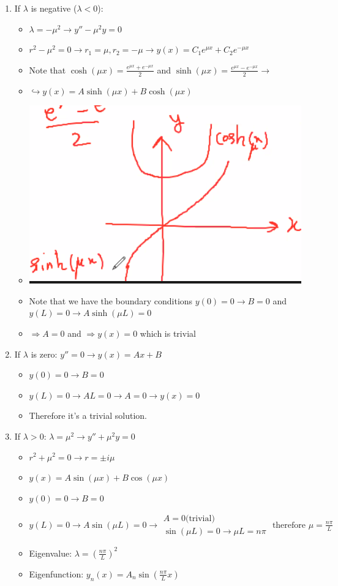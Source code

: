 \documentclass{article}
\begin{document}
\begin{enumerate}
    \item If $\lambda$ is negative ($\lambda < 0 $): 
    \begin{itemize}
        \item $\lambda = -\mu^2 \to y'' - \mu^2 y = 0$
        \item $r^2 - \mu^2 = 0 \to r_1 = \mu, r_2 = -\mu \longrightarrow y(x) = C_1 e^{\mu x} + C_2 e^{-\mu x}$
        \item Note that $\cosh(\mu x) = \frac{e^{\mu x} + e^{-\mu x}}{2} $ and $\sinh(\mu x) = \frac{e^{\mu x} - e^{-\mu x}}{2} \longrightarrow$
        \item $\hookrightarrow y(x) = A \sinh(\mu x) + B \cosh(\mu x)$
        \item \includegraphics[width = 0.6 \textwidth]{image1.png}
        \item Note that we have the boundary conditions $y(0) = 0 \to B = 0$ and $y(L) = 0 \to A\sinh(\mu L) = 0$
        \item $\Rightarrow A = 0$ and $\Rightarrow y(x) = 0$ which is trivial
    \end{itemize}
    \item If $\lambda$ is zero: $y'' = 0 \longrightarrow y(x) = Ax + B$
    \begin{itemize}
        \item $y(0) = 0 \longrightarrow B = 0$
        \item $y(L) = 0 \longrightarrow AL = 0 \to A = 0 \to y(x) = 0$
        \item Therefore it's a trivial solution. 
    \end{itemize}
    \item If $\lambda > 0$: $\lambda = \mu^2 \to y'' + \mu^2 y = 0$
    \begin{itemize}
        \item $r^2 + \mu^2 = 0 \longrightarrow r = \pm i \mu$
        \item $y(x) = A \sin(\mu x) + B \cos(\mu x)$
        \item $y(0) = 0 \to B = 0$
        \item $y(L) = 0 \to A \sin(\mu L) = 0 \to \begin{matrix} A = 0 \text{(trivial)} \\ \sin(\mu L) = 0 \to \mu L = n \pi  \end{matrix} \text{ therefore } \mu = \frac{n \pi}{L}$
        \item Eigenvalue: $\lambda = \left(\frac{n \pi}{L} \right)^2$
        \item Eigenfunction: $y_n(x) = A_n \sin(\frac{n \pi}{L} x)$
    \end{itemize}
\end{enumerate}
\end{document}
